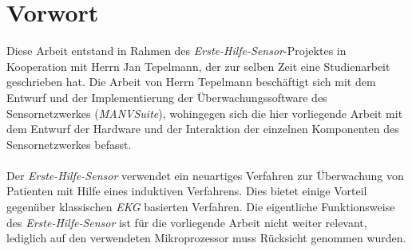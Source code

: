 \chapter*{Vorwort} 

Diese Arbeit entstand in Rahmen des \emph{Erste-Hilfe-Sensor}-Projektes in Kooperation mit Herrn Jan Tepelmann,
der zur selben Zeit eine Studienarbeit geschrieben hat\cite{Jan}. Die Arbeit von Herrn Tepelmann
beschäftigt sich mit dem Entwurf und der Implementierung der Überwachungssoftware des Sensornetzwerkes
(\emph{MANVSuite}), wohingegen sich die hier vorliegende Arbeit mit dem Entwurf der Hardware und der Interaktion der
einzelnen Komponenten des Sensornetzwerkes befasst.\\
\\
Der \emph{Erste-Hilfe-Sensor} verwendet ein neuartiges Verfahren zur Überwachung von Patienten mit Hilfe eines induktiven
Verfahrens. Dies bietet einige Vorteil gegenüber klassischen \emph{EKG} basierten Verfahren. Die eigentliche Funktionsweise
des \emph{Erste-Hilfe-Sensor} ist für die vorliegende Arbeit nicht weiter relevant, lediglich auf den verwendeten
Mikroprozessor muss Rücksicht genommen wurden.
